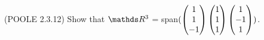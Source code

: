 \begin{problem}{\problemnum \, \textsf{(POOLE 2.3.12)}}
    Show that $\bbR^3$ = span$(\begin{pmatrix}  1 \\  1 \\ -1\end{pmatrix}
                                      \begin{pmatrix}  1 \\  1 \\  1\end{pmatrix}
                                      \begin{pmatrix}  1 \\ -1 \\  1\end{pmatrix})$.
\end{problem}
\begin{solution}

\end{solution}
